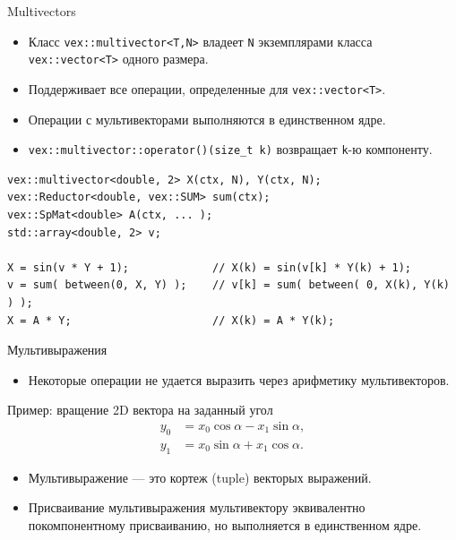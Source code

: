 \documentclass[@BEAMER_OPTIONS@]{beamer}
\newcommand{\code}[1]{\lstinline|#1|}
\begin{document}
\begin{frame}[fragile]{Multivectors}
    \begin{itemize}
        \item Класс \code{vex::multivector<T,N>} владеет \code{N} экземплярами
            класса \code{vex::vector<T>} одного размера.
        \item Поддерживает все операции, определенные для
            \code{vex::vector<T>}.
        \item Операции с мультивекторами выполняются в единственном ядре.
        \item \code{vex::multivector::operator()(size_t k)} возвращает
            \code{k}-ю компоненту.
    \end{itemize}
    \begin{exampleblock}{}
        \begin{lstlisting}
vex::multivector<double, 2> X(ctx, N), Y(ctx, N);
vex::Reductor<double, vex::SUM> sum(ctx);
vex::SpMat<double> A(ctx, ... );
std::array<double, 2> v;

X = sin(v * Y + 1);             // X(k) = sin(v[k] * Y(k) + 1);
v = sum( between(0, X, Y) );    // v[k] = sum( between( 0, X(k), Y(k) ) );
X = A * Y;                      // X(k) = A * Y(k);
        \end{lstlisting}
    \end{exampleblock}
\end{frame}


\begin{frame}[fragile]{Мультивыражения}
    \begin{itemize}
        \item Некоторые операции не удается выразить через арифметику
            мультивекторов.
    \end{itemize}
    \begin{block}{Пример: вращение 2D вектора на заданный угол}
        \vspace{-1\baselineskip}
        \begin{align*}
            y_0 &= x_0 \cos \alpha - x_1 \sin \alpha, \\
            y_1 &= x_0 \sin \alpha + x_1 \cos \alpha.
        \end{align*}
    \end{block}

    \begin{itemize}
        \item Мультивыражение --- это кортеж (tuple) векторых выражений.
        \item Присваивание мультивыражения мультивектору эквивалентно
            покомпонентному присваиванию, но выполняется в единственном ядре.
    \end{itemize}
\end{frame}
\end{document}
